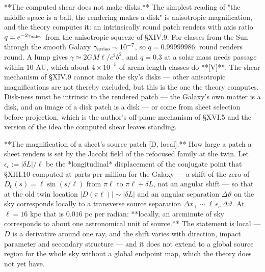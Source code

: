 **The computed shear does not make disks.** The simplest reading of "the middle space is a ball, the rendering makes a disk" is anisotropic magnification, and the theory computes it: an intrinsically round patch renders with axis ratio $q = e^{-2\gamma_{\rm aniso} }$ from the anisotropic squeeze of §XIV.9. For classes from the Sun through the smooth Galaxy $\gamma_{\rm aniso}\sim10^{-7}$, so $q = 0.99999986$: round renders round. A lump gives $\gamma\simeq2GM\ell/c^2b^2$, and $q = 0.3$ at a solar mass needs passage within $10$ AU, which about $4\times10^{-5}$ of arena-length classes do **[V]**. The shear mechanism of §XIV.9 cannot make the sky's disks — other anisotropic magnifications are not thereby excluded, but this is the one the theory computes. Disk-ness must be intrinsic to the rendered patch — the Galaxy's own matter is a disk, and an image of a disk patch is a disk — or come from sheet selection before projection, which is the author's off-plane mechanism of §XVI.5 and the version of the idea the computed shear leaves standing.

**The magnification of a sheet's source patch [D, local].** How large a patch a sheet renders is set by the Jacobi field of the refocused family at the twin. Let $\epsilon_c := |\delta L|/\ell$ be the *longitudinal* displacement of the conjugate point that §XIII.10 computed at parts per million for the Galaxy — a shift of the zero of $D_0(s) = \ell\sin(s/\ell)$ from $\pi\ell$ to $\pi\ell+\delta L$, not an angular shift — so that at the old twin location $|D(\pi\ell)|\sim|\delta L|$ and an angular separation $\Delta\vartheta$ on the sky corresponds locally to a transverse source separation $\Delta x_\perp\sim\ell\,\epsilon_c\,\Delta\vartheta$. At $\ell = 16$ kpc that is $0.016$ pc per radian: **locally, an arcminute of sky corresponds to about one astronomical unit of source.** The statement is local — $D$ is a derivative around one ray, and the shift varies with direction, impact parameter and secondary structure — and it does not extend to a global source region for the whole sky without a global endpoint map, which the theory does not yet have.

